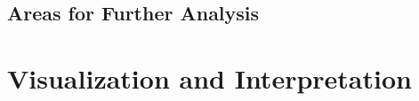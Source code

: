\documentclass[11pt]{article}
\begin{document}
\subsection{Areas for Further Analysis}



\section{Visualization and Interpretation}

\end{document}
